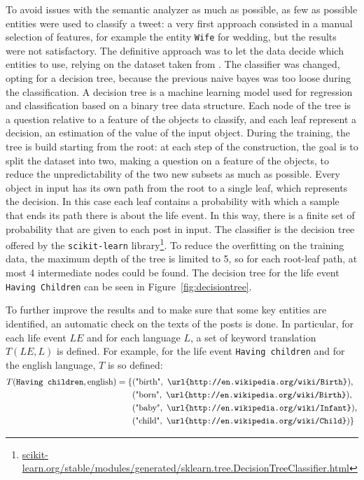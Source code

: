 To avoid issues with the semantic analyzer as much as possible, as few as possible entities were used to classify a tweet: a very first approach consisted in a manual selection of features, for example the entity \texttt{Wife} for wedding, but the results were not satisfactory. The definitive approach was to let the data decide which entities to use, relying on the dataset taken from \cite{dickinson2015identifying}. The classifier was changed, opting for a decision tree, because the previous naive bayes was too loose during the classification. A decision tree is a machine learning model used for regression and classification based on a binary tree data structure. Each node of the tree is a question relative to a feature of the objects to classify, and each leaf represent a decision, an estimation of the value of the input object. During the training, the tree is build starting from the root: at each step of the construction, the goal is to split the dataset into two, making a question on a feature of the objects, to reduce the unpredictability of the two new subsets as much as possible. Every object in input has its own path from the root to a single leaf, which represents the decision. In this case each leaf contains a probability with which a sample that ends its path there is about the life event. In this way, there is a finite set of probability that are given to each post in input. The classifier is the decision tree offered by the \texttt{scikit-learn} library\footnote{\url{scikit-learn.org/stable/modules/generated/sklearn.tree.DecisionTreeClassifier.html}}. To reduce the overfitting on the training data, the maximum depth of the tree is limited to 5, so for each root-leaf path, at most 4 intermediate nodes could be found. The decision tree for the life event \texttt{Having Children} can be seen in Figure~\ref{fig:decisiontree}.

To further improve the results and to make sure that some key entities are identified, an automatic check on the texts of the posts is done. In particular, for each life event $LE$ and for each language $L$, a set of keyword translation $T(LE, L)$ is defined. For example, for the life event \texttt{Having children} and for the english language, $T$ is so defined:
\begin{equation*}
\begin{split}
T(\text{\texttt{Having children}}, \text{english}) = \{&(\text{"birth"}, \text{ \texttt{\url{http://en.wikipedia.org/wiki/Birth}}}),\\&(\text{"born"}, \text{ \texttt{\url{http://en.wikipedia.org/wiki/Birth}}}),\\&(\text{"baby"}, \text{ \texttt{\url{http://en.wikipedia.org/wiki/Infant}}}),\\&(\text{"child"}, \text{ \texttt{\url{http://en.wikipedia.org/wiki/Child}}})\}
\end{split}
\end{equation*}

